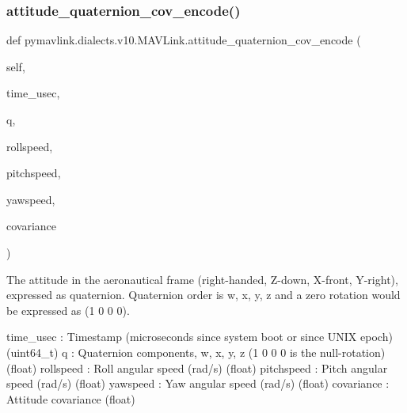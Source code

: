 \subsubsection{\texorpdfstring{attitude\+\_\+quaternion\+\_\+cov\+\_\+encode()}{attitude\_quaternion\_cov\_encode()}}
{\footnotesize\ttfamily def pymavlink.\+dialects.\+v10.\+M\+A\+V\+Link.\+attitude\+\_\+quaternion\+\_\+cov\+\_\+encode (\begin{DoxyParamCaption}\item[{}]{self,  }\item[{}]{time\+\_\+usec,  }\item[{}]{q,  }\item[{}]{rollspeed,  }\item[{}]{pitchspeed,  }\item[{}]{yawspeed,  }\item[{}]{covariance }\end{DoxyParamCaption})}

\begin{DoxyVerb}The attitude in the aeronautical frame (right-handed, Z-down, X-front,
Y-right), expressed as quaternion. Quaternion order is
w, x, y, z and a zero rotation would be expressed as
(1 0 0 0).

time_usec                 : Timestamp (microseconds since system boot or since UNIX epoch) (uint64_t)
q                         : Quaternion components, w, x, y, z (1 0 0 0 is the null-rotation) (float)
rollspeed                 : Roll angular speed (rad/s) (float)
pitchspeed                : Pitch angular speed (rad/s) (float)
yawspeed                  : Yaw angular speed (rad/s) (float)
covariance                : Attitude covariance (float)\end{DoxyVerb}
 \mbox{\label{classpymavlink_1_1dialects_1_1v10_1_1MAVLink_a7eb3bf7ac23f879b0d55f77b642cc759}} 
